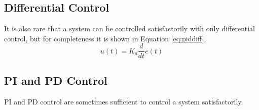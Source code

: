 \subsection{Differential Control}
It is also rare that a system can be controlled satisfactorily with only
differential control, but for completeness it is shown in Equation \ref{eq:piddiff}.
\begin{equation}
    \label{eq:piddiff}
    u(t) = K_d\frac{d}{dt}e(t) 
\end{equation}

\subsection{PI and PD Control}
PI and PD control are sometimes sufficient to control a system satisfactorily.

